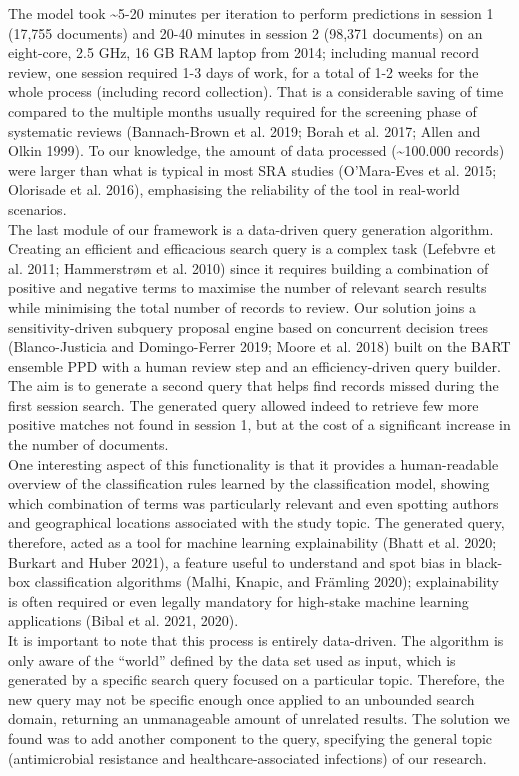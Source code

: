 \documentclass{article}
\begin{document}
The model took \textasciitilde5-20 minutes per iteration to perform
predictions in session 1 (17,755 documents) and 20-40 minutes in session
2 (98,371 documents) on an eight-core, 2.5 GHz, 16 GB RAM laptop from
2014; including manual record review, one session required 1-3 days of
work, for a total of 1-2 weeks for the whole process (including record
collection). That is a considerable saving of time compared to the
multiple months usually required for the screening phase of systematic
reviews (Bannach-Brown et al. 2019; Borah et al. 2017; Allen and Olkin
1999). To our knowledge, the amount of data processed
(\textasciitilde100.000 records) were larger than what is typical in
most SRA studies (O'Mara-Eves et al. 2015; Olorisade et al. 2016),
emphasising the reliability of the tool in real-world scenarios.\\

The last module of our framework is a data-driven query generation
algorithm. Creating an efficient and efficacious search query is a
complex task (Lefebvre et al. 2011; Hammerstrøm et al. 2010) since it
requires building a combination of positive and negative terms to
maximise the number of relevant search results while minimising the
total number of records to review. Our solution joins a
sensitivity-driven subquery proposal engine based on concurrent decision
trees (Blanco-Justicia and Domingo-Ferrer 2019; Moore et al. 2018) built
on the BART ensemble PPD with a human review step and an
efficiency-driven query builder. The aim is to generate a second query
that helps find records missed during the first session search. The
generated query allowed indeed to retrieve few more positive matches not
found in session 1, but at the cost of a significant increase in the
number of documents.\\
One interesting aspect of this functionality is that it provides a
human-readable overview of the classification rules learned by the
classification model, showing which combination of terms was
particularly relevant and even spotting authors and geographical
locations associated with the study topic. The generated query,
therefore, acted as a tool for machine learning explainability (Bhatt et
al. 2020; Burkart and Huber 2021), a feature useful to understand and
spot bias in black-box classification algorithms (Malhi, Knapic, and
Främling 2020); explainability is often required or even legally
mandatory for high-stake machine learning applications (Bibal et al.
2021, 2020).\\
It is important to note that this process is entirely data-driven. The
algorithm is only aware of the ``world'' defined by the data set used as
input, which is generated by a specific search query focused on a
particular topic. Therefore, the new query may not be specific enough
once applied to an unbounded search domain, returning an unmanageable
amount of unrelated results. The solution we found was to add another
component to the query, specifying the general topic (antimicrobial
resistance and healthcare-associated infections) of our research.\\
\end{document}
